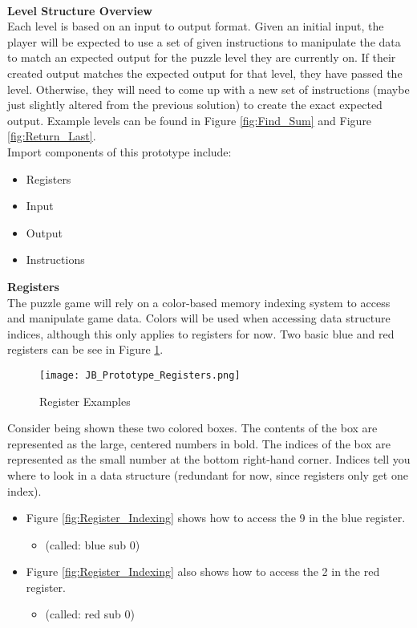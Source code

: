 \\
\textbf{Level Structure Overview}\\

Each level is based on an input to output format. Given an initial input, the player
will be expected to use a set of given instructions to manipulate the data to
match an expected output for the puzzle level they are currently on. If their
created output matches the expected output for that level, they have passed the level.
Otherwise, they will need to come up with a new set of instructions (maybe just
slightly altered from the previous solution) to create the exact expected output.
Example levels can be found in Figure \ref{fig:Find_Sum} and Figure \ref{fig:Return_Last}.\\

Import components of this prototype include:
\begin{itemize}
  \item Registers
  \item Input
  \item Output
  \item Instructions
\end{itemize}

\textbf{Registers}\\

The puzzle game will rely on a color-based memory indexing system to access and
manipulate game data. Colors will be used when accessing data structure indices,
although this only applies to registers for now. Two basic blue and red registers
can be see in Figure \ref{fig:Register_Examples}.

\begin{figure}[!hb]
  \caption{Register Examples}
  \label{fig:Register_Examples}
  \centering
  \texttt{[image: JB\_Prototype\_Registers.png]}
\end{figure}

Consider being shown these two colored boxes. The contents of the box are represented
as the large, centered numbers in bold. The indices of the box are represented as the
small number at the bottom right-hand corner. Indices tell you where to look in a
data structure (redundant for now, since registers only get one index).

\begin{itemize}
  \item Figure \ref{fig:Register_Indexing} shows how to access the 9 in the blue register.
  \begin{itemize}
    \item (called: blue sub 0)
  \end{itemize}
  \item Figure \ref{fig:Register_Indexing} also shows how to access the 2 in the red register.
  \begin{itemize}
    \item (called: red sub 0)
  \end{itemize}
\end{itemize}

